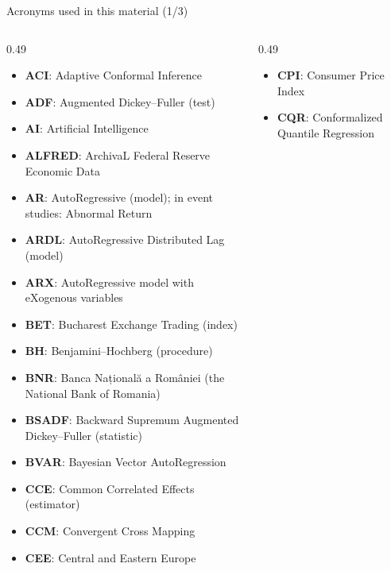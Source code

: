 {
\begin{frame}[noframenumbering]
    \titlepage
\end{frame}
}
\begin{frame}{Acronyms used in this material (1/3)}
\begin{columns}[T]
\begin{column}{0.49\textwidth}
\begin{itemize}\setlength{\itemsep}{0pt}
    \item \textbf{ACI}: Adaptive Conformal Inference
    \item \textbf{ADF}: Augmented Dickey–Fuller (test)
    \item \textbf{AI}: Artificial Intelligence
    \item \textbf{ALFRED}: ArchivaL Federal Reserve Economic Data
    \item \textbf{AR}: AutoRegressive (model); in event studies: Abnormal Return
    \item \textbf{ARDL}: AutoRegressive Distributed Lag (model)
    \item \textbf{ARX}: AutoRegressive model with eXogenous variables
    \item \textbf{BET}: Bucharest Exchange Trading (index)
    \item \textbf{BH}: Benjamini–Hochberg (procedure)
    \item \textbf{BNR}: Banca Națională a României (the National Bank of Romania)
    \item \textbf{BSADF}: Backward Supremum Augmented Dickey–Fuller (statistic)
    \item \textbf{BVAR}: Bayesian Vector AutoRegression
    \item \textbf{CCE}: Common Correlated Effects (estimator)
    \item \textbf{CCM}: Convergent Cross Mapping
    \item \textbf{CEE}: Central and Eastern Europe
\end{itemize}
\end{column}
\begin{column}{0.49\textwidth}
\begin{itemize}\setlength{\itemsep}{0pt}
    \item \textbf{CPI}: Consumer Price Index
    \item \textbf{CQR}: Conformalized Quantile Regression

\end{itemize}
\end{column}
\end{columns}
\end{frame}
